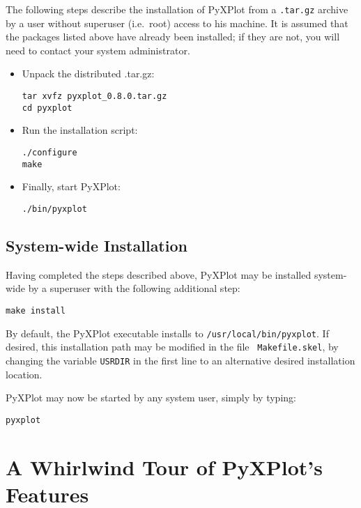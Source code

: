 The following steps describe the installation of PyXPlot from a {\tt .tar.gz}
archive by a user without superuser (i.e.\ root) access to his machine. It is
assumed that the packages listed above have already been installed; if they are
not, you will need to contact your system
administrator.

\begin{itemize}
\item Unpack the distributed .tar.gz:

\begin{verbatim}
tar xvfz pyxplot_0.8.0.tar.gz
cd pyxplot
\end{verbatim}

\item Run the installation script:

\begin{verbatim}
./configure
make
\end{verbatim}

\item Finally, start PyXPlot:

\begin{verbatim}
./bin/pyxplot
\end{verbatim}

\end{itemize}

\subsection{System-wide Installation}

Having completed the steps described above, PyXPlot may be installed
system-wide by a superuser with the following additional
step:

\begin{verbatim}
make install
\end{verbatim}

By default, the PyXPlot executable installs to {\tt /usr/local/bin/pyxplot}.
If desired, this installation path may be modified in the file {\tt
Makefile.skel}, by changing the variable {\tt USRDIR} in the first line to an
alternative desired installation location.

PyXPlot may now be started by any system user, simply by typing:

\begin{verbatim}
pyxplot
\end{verbatim}

\section{A Whirlwind Tour of PyXPlot's Features}

